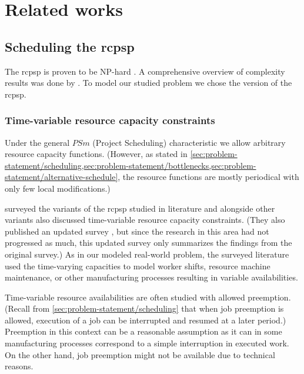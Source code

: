 \chapter{Related works} \label{chap:related-works}

\section{Scheduling the \acs{rcpsp}} \label{sec:related-works/scheduling-the-rcpsp}

The \ac{rcpsp} is proven to be NP-hard \citep{Blazewicz1983}.
A comprehensive overview of complexity results was done by \citet{Ganian2021}.
To model our studied problem we chose the \Problem{} version of the \ac{rcpsp}.
\subsection{Time-variable resource capacity constraints} \label{subsec:related-works/scheduling-the-rcpsp/time-variable-resource-capacity-constraints}

Under the general $PSm$ (Project Scheduling) characteristic we allow arbitrary resource capacity functions.
(However, as stated in \cref{sec:problem-statement/scheduling,sec:problem-statement/bottlenecks,sec:problem-statement/alternative-schedule},
the resource functions are mostly periodical with only few local modifications.)

\citet{Hartmann2010} surveyed the variants of the \ac{rcpsp} studied in literature and alongside other variants also
discussed time-variable resource capacity constraints.
(They also published an updated survey \citep{Hartmann2022},
but since the research in this area had not progressed as much,
this updated survey only summarizes the findings from the original survey.)
As in our modeled real-world problem, the surveyed literature used the time-varying capacities to model
worker shifts, resource machine maintenance, or other manufacturing processes resulting in variable availabilities.

Time-variable resource availabilities are often studied with allowed preemption.
(Recall from \cref{sec:problem-statement/scheduling} that when job preemption is allowed,
execution of a job can be interrupted and resumed at a later period.)
Preemption in this context can be a reasonable assumption as it can in some manufacturing processes
correspond to a simple interruption in executed work.
On the other hand, job preemption might not be available due to technical reasons.

